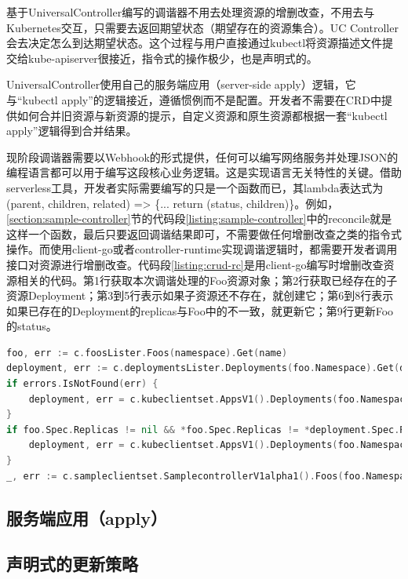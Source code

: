 \documentclass[macfonts,master]{njuthesis}
\begin{document}
基于UniversalController编写的调谐器不用去处理资源的增删改查，不用去与Kubernetes交互，只需要去返回期望状态（期望存在的资源集合）。UC Controller会去决定怎么到达期望状态。这个过程与用户直接通过kubectl将资源描述文件提交给kube-apiserver很接近，指令式的操作极少，也是声明式的。

UniversalController使用自己的服务端应用（server-side apply）逻辑，它与``kubectl apply''的逻辑接近，遵循惯例而不是配置。开发者不需要在CRD中提供如何合并旧资源与新资源的提示，自定义资源和原生资源都根据一套``kubectl apply''逻辑得到合并结果。

现阶段调谐器需要以Webhook的形式提供，任何可以编写网络服务并处理JSON的编程语言都可以用于编写这段核心业务逻辑。这是实现语言无关特性的关键。借助serverless工具，开发者实际需要编写的只是一个函数而已，其lambda表达式为(parent, children, related) => \{... return (status, children)\}。例如，\ref{section:sample-controller}节的代码段\ref{listing:sample-controller}中的reconcile就是这样一个函数，最后只要返回调谐结果即可，不需要做任何增删改查之类的指令式操作。而使用client-go或者controller-runtime实现调谐逻辑时，都需要开发者调用接口对资源进行增删改查。代码段\ref{listing:crud-rc}是用client-go编写时增删改查资源相关的代码。第1行获取本次调谐处理的Foo资源对象；第2行获取已经存在的子资源Deployment；第3到5行表示如果子资源还不存在，就创建它；第6到8行表示如果已存在的Deployment的replicas与Foo中的不一致，就更新它；第9行更新Foo的status。
\begin{lstlisting}[language=Go,caption=sample-controller中对资源进行增删改查的代码段,label=listing:crud-rc]
foo, err := c.foosLister.Foos(namespace).Get(name)
deployment, err := c.deploymentsLister.Deployments(foo.Namespace).Get(deploymentName)
if errors.IsNotFound(err) {
    deployment, err = c.kubeclientset.AppsV1().Deployments(foo.Namespace).Create(context.TODO(), newDeployment(foo), metav1.CreateOptions{})
}
if foo.Spec.Replicas != nil && *foo.Spec.Replicas != *deployment.Spec.Replicas {
    deployment, err = c.kubeclientset.AppsV1().Deployments(foo.Namespace).Update(context.TODO(), newDeployment(foo), metav1.UpdateOptions{})
}
_, err := c.sampleclientset.SamplecontrollerV1alpha1().Foos(foo.Namespace).Update(context.TODO(), fooCopy, metav1.UpdateOptions{})
\end{lstlisting}

\subsection{服务端应用（apply）}


\subsection{声明式的更新策略}
\end{document}
